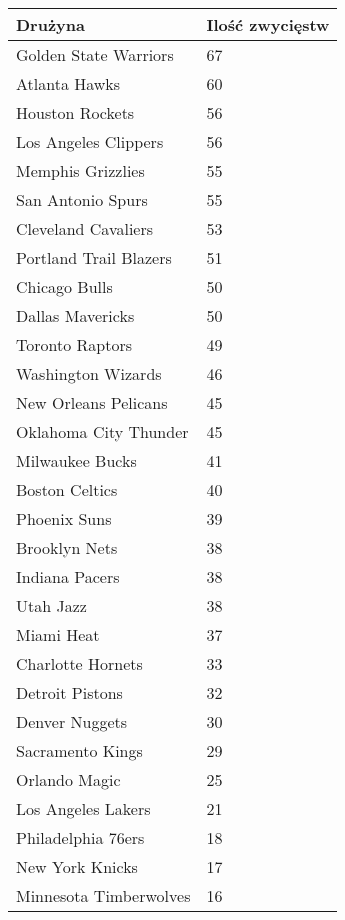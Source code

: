 \documentclass[inzynierska]{pwr_wmat_praca_dyplomowa}
\theoremstyle{plain}
\numberwithin{theorem}{chapter}
\theoremstyle{definition}
\numberwithin{theorem}{chapter}
\begin{document}
\begin{table}[]
\begin{tabular}{|p{6cm}|p{4cm}|}
	\hline
	\textbf{Drużyna}      & \textbf{Ilość zwycięstw} \\ \hline
	Golden State Warriors & 67 \\ \hline
	Atlanta Hawks & 60 \\ \hline
	Houston Rockets & 56 \\ \hline
	Los Angeles Clippers & 56 \\ \hline
	Memphis Grizzlies & 55 \\ \hline
	San Antonio Spurs & 55 \\ \hline
	Cleveland Cavaliers & 53 \\ \hline
	Portland Trail Blazers & 51 \\ \hline	
	Chicago Bulls & 50 \\ \hline	
	Dallas Mavericks & 50 \\ \hline	
	Toronto Raptors & 49 \\ \hline
	Washington Wizards & 46 \\ \hline
	New Orleans Pelicans & 45 \\ \hline
	Oklahoma City Thunder & 45 \\ \hline
	Milwaukee Bucks & 41 \\ \hline
	Boston Celtics & 40 \\ \hline
	Phoenix Suns & 39 \\ \hline
	Brooklyn Nets & 38 \\ \hline
	Indiana Pacers & 38 \\ \hline
	Utah Jazz & 38 \\ \hline
	Miami Heat & 37 \\ \hline
	Charlotte Hornets & 33 \\ \hline
	Detroit Pistons & 32 \\ \hline
	Denver Nuggets & 30\\ \hline
	Sacramento Kings & 29 \\ \hline
	Orlando Magic & 25 \\ \hline
	Los Angeles Lakers & 21 \\ \hline
	Philadelphia 76ers & 18 \\ \hline
	New York Knicks & 17 \\ \hline
	Minnesota Timberwolves & 16 \\ \hline
\end{tabular}	
\end{table}
\end{document}
